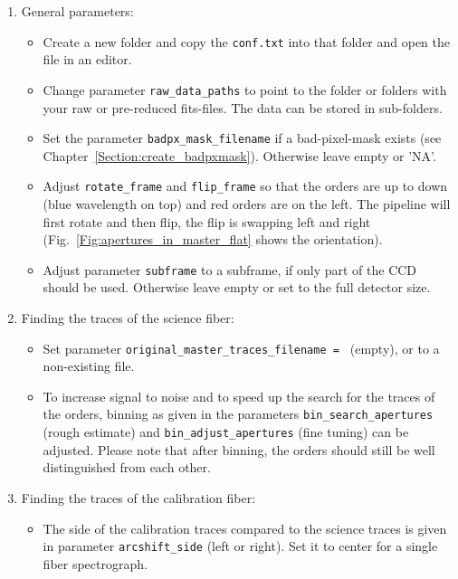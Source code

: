 \documentclass[10pt,a4paper]{article}
\begin{document}
\begin{enumerate}
  \item General parameters: \vspace*{-\itemsep}
  \begin{itemize}[leftmargin=*]\setlength\itemsep{0em}
    \item Create a new folder and copy the \verb|conf.txt| into that folder and open the file in an editor.
    \item Change parameter \verb|raw_data_paths| to point to the folder or folders with your raw or pre-reduced fits-files. The data can be stored in sub-folders.
    \item Set the parameter \verb|badpx_mask_filename| if a bad-pixel-mask exists (see Chapter~\ref{Section:create_badpxmask}). Otherwise leave empty or 'NA'.
    \item Adjust \verb|rotate_frame| and \verb|flip_frame| so that the orders are up to down (blue wavelength on top) and red orders are on the left. The pipeline will first rotate and then flip, the flip is swapping left and right (Fig.~\ref{Fig:apertures_in_master_flat} shows the orientation).
    \item Adjust parameter \verb|subframe| to a subframe, if only part of the CCD should be used. Otherwise leave empty or set to the full detector size.
  \end{itemize}
 
  \item Finding the traces of the science fiber: \vspace*{-\itemsep}
  \begin{itemize}[leftmargin=*]\setlength\itemsep{0em}
    \item Set parameter \verb|original_master_traces_filename = | (empty), or to a non-existing file.
    \item To increase signal to noise and to speed up the search for the traces of the orders, binning as given in the parameters \verb|bin_search_apertures| (rough estimate) and \verb|bin_adjust_apertures| (fine tuning) can be adjusted. Please note that after binning, the orders should still be well distinguished from each other. %
  \end{itemize}
  
  \item Finding the traces of the calibration fiber: \vspace*{-\itemsep}
  \begin{itemize}[leftmargin=*]\setlength\itemsep{0em}
    \item The side of the calibration traces compared to the science traces is given in parameter \verb|arcshift_side| (left or right). Set it to center for a single fiber spectrograph.
  \end{itemize}
  

\end{enumerate}
\end{document}
